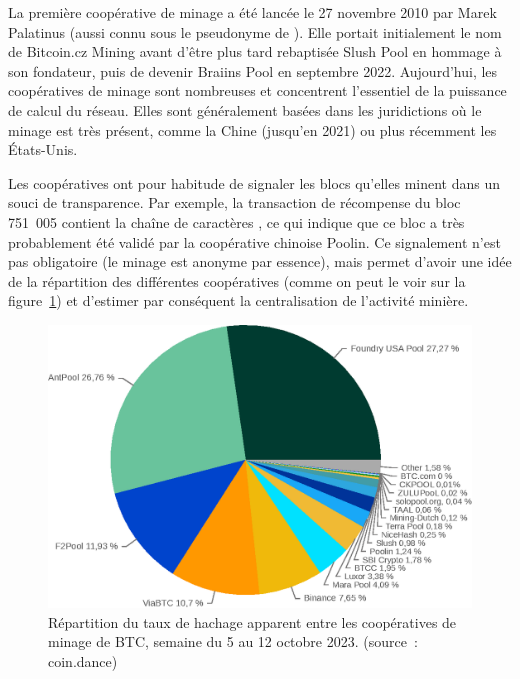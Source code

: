 
La première coopérative de minage a été lancée le 27 novembre 2010 par Marek Palatinus (aussi connu sous le pseudonyme de ). Elle portait initialement le nom de Bitcoin.cz Mining avant d'être plus tard rebaptisée Slush Pool en hommage à son fondateur, puis de devenir Braiins Pool en septembre 2022. Aujourd'hui, les coopératives de minage sont nombreuses et concentrent l'essentiel de la puissance de calcul du réseau. Elles sont généralement basées dans les juridictions où le minage est très présent, comme la Chine (jusqu'en 2021) ou plus récemment les États-Unis.

Les coopératives ont pour habitude de signaler les blocs qu'elles minent dans un souci de transparence. Par exemple, la transaction de récompense du bloc 751~005 contient la chaîne de caractères , ce qui indique que ce bloc a très probablement été validé par la coopérative chinoise Poolin. Ce signalement n'est pas obligatoire (le minage est anonyme par essence), mais permet d'avoir une idée de la répartition des différentes coopératives (comme on peut le voir sur la figure~\ref{fig:hashrate-distribution}) et d'estimer par conséquent la centralisation de l'activité minière.


\begin{figure}[h]
  \centering
  \includegraphics[scale=0.75]{img/hashrate-distribution-coin-dance-week-20231012.eps}
  \caption{Répartition du taux de hachage apparent entre les coopératives de minage de BTC, semaine du 5 au 12 octobre 2023. (source~: coin.dance)}
  \label{fig:hashrate-distribution}
\end{figure}

